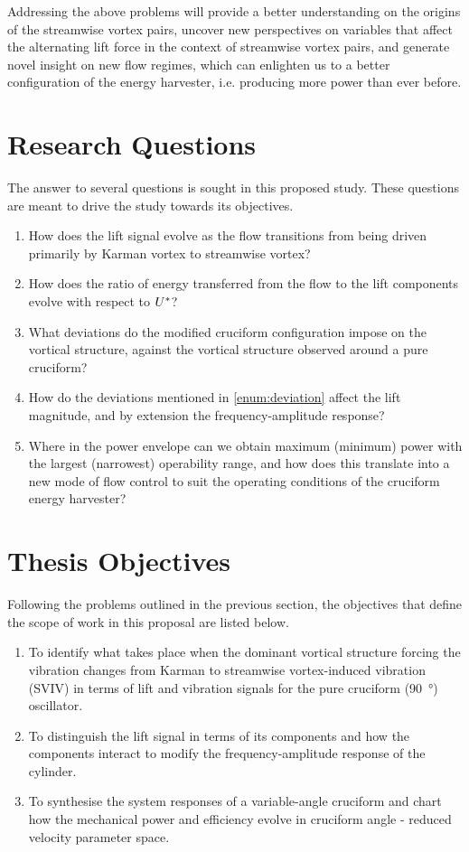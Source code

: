 \documentclass[oneside]{utmthesis}
\begin{document}
Addressing the above problems will provide a better understanding on the origins of the streamwise vortex pairs, uncover new perspectives on variables that affect the alternating lift force in the context of streamwise vortex pairs, and generate novel insight on new flow regimes, which can enlighten us to a better configuration of the energy harvester, i.e. producing more power than ever before.

\section{Research Questions}

The answer to several questions is sought in this proposed study. These questions are meant to drive the study towards its objectives.
\begin{enumerate}
  \item How does the lift signal evolve as the flow transitions from being driven primarily by Karman vortex to streamwise vortex?
  \item How does the ratio of energy transferred from the flow to the lift components evolve with respect to $U^{*}$?
  \item What deviations do the modified cruciform configuration impose on the vortical structure, against the vortical structure observed around a pure cruciform? \label{enum:deviation}
  \item How do the deviations mentioned in \ref{enum:deviation} affect the lift magnitude, and by extension the frequency-amplitude response?
  \item Where in the power envelope can we obtain maximum (minimum) power with the largest (narrowest) operability range, and how does this translate into a new mode of flow control to suit the operating conditions of the cruciform energy harvester?
\end{enumerate}

\section{Thesis Objectives}
Following the problems outlined in the previous section, the objectives that define the scope of work in this proposal are listed below.

\begin{enumerate}
  \item To identify what takes place when the dominant vortical structure forcing the vibration changes from Karman to streamwise vortex-induced vibration (SVIV) in terms of lift and vibration signals for the pure cruciform (\SI{90}{\degree}) oscillator. \label{enum:whatHappens}
  \item To distinguish the lift signal in terms of its components and how the components interact to modify the frequency-amplitude response of the cylinder. \label{enum:characteriseLift}
  \item To synthesise the system responses of a variable-angle cruciform and chart how the mechanical power and efficiency evolve in cruciform angle - reduced velocity parameter space. \label{enum:passiveControl}
\end{enumerate}
\end{document}
